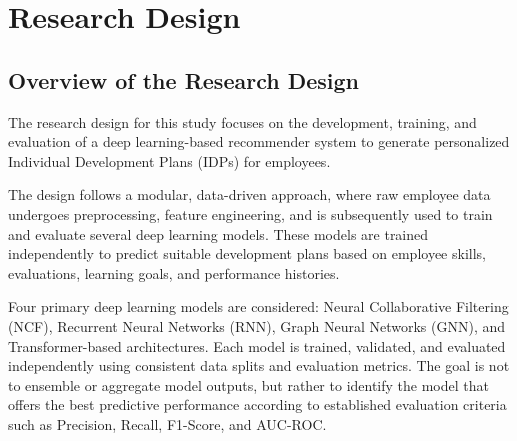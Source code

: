 \chapter{Research Design}
\label{chapter:rd}

\section{Overview of the Research Design}
\label{section:research_design_overview}

The research design for this study focuses on the development, training, and evaluation of a deep learning-based recommender system to generate personalized Individual Development Plans (IDPs) for employees. 

The design follows a modular, data-driven approach, where raw employee data undergoes preprocessing, feature engineering, and is subsequently used to train and evaluate several deep learning models. These models are trained independently to predict suitable development plans based on employee skills, evaluations, learning goals, and performance histories.

Four primary deep learning models are considered: Neural Collaborative Filtering (NCF), Recurrent Neural Networks (RNN), Graph Neural Networks (GNN), and Transformer-based architectures. Each model is trained, validated, and evaluated independently using consistent data splits and evaluation metrics. The goal is not to ensemble or aggregate model outputs, but rather to identify the model that offers the best predictive performance according to established evaluation criteria such as Precision, Recall, F1-Score, and AUC-ROC.

